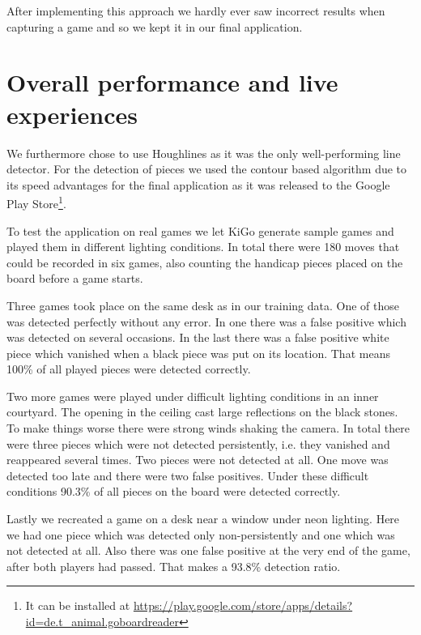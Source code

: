 	After implementing this approach we hardly ever saw incorrect results when capturing a game and so we kept it in our final application.





	\section{Overall performance and live experiences}
	We furthermore chose to use Houghlines as it was the only well-performing line detector. For the detection of pieces we used the contour based algorithm due to its speed advantages for the final application as it was released to the Google Play Store\footnote{It can be installed at \url{https://play.google.com/store/apps/details?id=de.t_animal.goboardreader}}.

	To test the application on real games we let KiGo generate sample games and played them in different lighting conditions. In total there were 180 moves that could be recorded in six games, also counting the handicap pieces placed on the board before a game starts.

	Three games took place on the same desk as in our training data. One of those was detected perfectly without any error. In one there was a false positive which was detected on several occasions. In the last there was a false positive white piece which vanished when a black piece was put on its location. That means 100\% of all played pieces were detected correctly.

	Two more games were played under difficult lighting conditions in an inner courtyard. The opening in the ceiling cast large reflections on the black stones. To make things worse there were strong winds shaking the camera. In total there were three pieces which were not detected persistently, i.e. they vanished and reappeared several times. Two pieces were not detected at all. One move was detected too late and there were two false positives. Under these difficult conditions 90.3\% of all pieces on the board were detected correctly.

	Lastly we recreated a game on a desk near a window under neon lighting. Here we had one piece which was detected only non-persistently and one which was not detected at all. Also there was one false positive at the very end of the game, after both players had passed. That makes a 93.8\% detection ratio.

